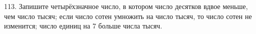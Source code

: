 113. Запишите четырёхзначное число, в котором число десятков вдвое меньше, чем число тысяч; если число сотен умножить на число тысяч, то число сотен не изменится; число единиц на 7 больше числа тысяч.\\
